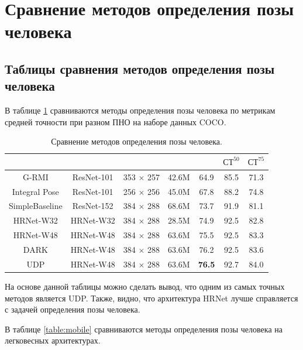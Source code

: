  

\section{Сравнение методов определения позы человека}

\subsection{Таблицы сравнения методов определения позы человека}

 В таблице \ref{table:standart} сравниваются методы определения позы человека по метрикам средней точности при разном ПНО на наборе данных COCO.

\begin{table}[ht!]
	\centering
	\caption{Сравнение методов определения позы человека.}
	\label{table:standart}
	\begin{tabular}{|c|c|c|c|c|c|c|}
		\hline
		\text{Метод} & \text{Архитектура} & \text{Вход} & \text{Параметры} & \text{СТ} & $\text{СТ}^{50}$ & $\text{СТ}^{75}$\\
		\hline
		G-RMI \cite{45680} & ResNet-101 & 353 $\times$ 257 & 42.6M & 64.9 & 85.5 & 71.3 \\
		\hline
		Integral Pose \cite{sun2017integral} & ResNet-101 & 256 $\times$ 256 & 45.0M & 67.8 & 88.2 & 74.8 \\
		\hline
		SimpleBaseline \cite{xiao2018simple} & ResNet-152 & 384 $\times$ 288 & 68.6M & 73.7 & 91.9 & 81.1 \\
		\hline
		HRNet-W32 \cite{sun2019deep} & HRNet-W32 & 384 $\times$ 288 & 28.5M & 74.9 & 92.5 & 82.8 \\
		\hline
		HRNet-W48 \cite{SunXLW19} & HRNet-W48 & 384 $\times$ 288 & 63.6M & 75.5 & 92.5 & 83.3 \\
		\hline
		DARK \cite{Zhang_2020_CVPR} & HRNet-W48 & 384 $\times$ 288 & 63.6M & 76.2 & 92.5 & 83.6 \\
		\hline
		UDP \cite{huang2020aid} & HRNet-W48 & 384 $\times$ 288 & 63.6M & \textbf{76.5} & 92.7 & 84.0 \\
		\hline
	\end{tabular}
\end{table}

На основе данной таблицы можно сделать вывод, что одним из самых точных методов является UDP. 
Также, видно, что архитектура HRNet лучше справляется с задачей определения позы человека.

В таблице \ref{table:mobile} сравниваются методы определения позы человека на легковесных архитектурах.


